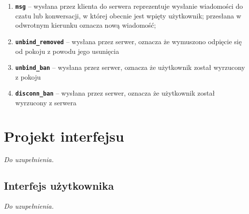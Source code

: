 \begin{enumerate}
	\item \textbf{\texttt{msg}} -- wysłana przez klienta do serwera reprezentuje
	wysłanie wiadomości do czatu lub konwersacji, w której obecnie jest wpięty użytkownik;
	przesłana w odwrotnym kierunku oznacza nową wiadomość;

	\item \textbf{\texttt{unbind\_removed}} -- wysłana przez serwer, oznacza że
	wymuszono odpięcie się od pokoju z powodu jego usunięcia

	\item \textbf{\texttt{unbind\_ban}} -- wysłana przez serwer, oznacza że użytkownik
	został wyrzucony z pokoju

	\item \textbf{\texttt{disconn\_ban}} -- wysłana przez serwer, oznacza że
	użytkownik został wyrzucony z serwera
\end{enumerate}

\section{Projekt interfejsu}

\textit{Do uzupełnienia.}

\subsection{Interfejs użytkownika}

\textit{Do uzupełnienia.}

